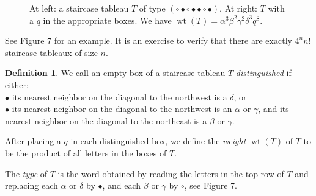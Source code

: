 \documentclass[11pt]{amsart}
\DeclareMathOperator{\wt}{wt}
\theoremstyle{definition}
\newtheorem{definition}[theorem]{Definition}
\theoremstyle{remark}
\begin{document}
\begin{figure}[h]
{
}
\caption{At left: a staircase tableau $T$
		of type $(\circ \bullet \circ \bullet \bullet
		\circ \bullet)$. At right: $T$
		with a $q$ in the appropriate boxes.
		We have $\wt(T)=\alpha^3 \beta^2
		\gamma^2 \delta^3 q^8$.} \label{fig:7}
\end{figure}

See Figure 7 for an example.
It is an exercise to verify that there are exactly $4^n n!$ staircase tableaux
of size $n$.

\begin{definition}
We call an empty box of a staircase tableau $T$
\emph{distinguished}  if either:\\
$\bullet$ its nearest neighbor on the diagonal to the northwest
is a $\delta$, or  \\
$\bullet$ its nearest neighbor on the diagonal to the northwest
is an $\alpha$ or $\gamma$, and its nearest neighbor
on the diagonal to the northeast is a $\beta$ or $\gamma$.

	After placing a $q$ in each distinguished box,
 we define the 
\emph{weight} $\wt(T)$ of $T$ to be the product of all
letters in the boxes of $T$.

The \emph{type} of $T$ is the word
obtained by reading the letters in the top row of $T$
and replacing each $\alpha$ or $\delta$
by $\bullet$, and each $\beta$ or $\gamma$ by 
$\circ$, 
see Figure 7.
\end{definition}
\end{document}
